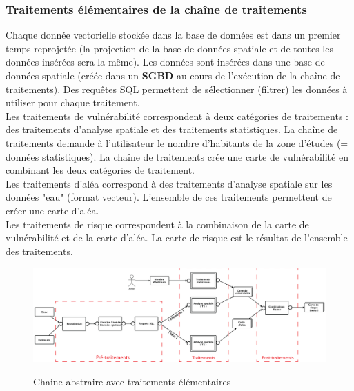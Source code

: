 \subsubsection{Traitements élémentaires de la chaîne de traitements}

Chaque donnée vectorielle stockée dans la base de données est dans un premier temps reprojetée (la projection de la base de données spatiale et de toutes les données insérées sera la même). Les données sont insérées dans une base de données spatiale (créée dans un \textbf{SGBD} au cours de l'exécution de la chaîne de traitements). Des requêtes SQL permettent de sélectionner (filtrer) les données à utiliser pour chaque traitement.\\

Les traitements de vulnérabilité correspondent à deux catégories de traitements : des traitements d'analyse spatiale et des traitements statistiques. La chaîne de traitements demande à l'utilisateur le nombre d'habitants de la zone d'études (= données statistiques). La chaîne de traitements crée une carte de vulnérabilité en combinant les deux catégories de traitement.\\

Les traitements d'aléa correspond à des traitements d'analyse spatiale sur les données "eau" (format vecteur). L'ensemble de ces traitements permettent de créer une carte d'aléa.\\

Les traitements de risque correspondent à la combinaison de la carte de vulnérabilité et de la carte d'aléa. La carte de risque est le résultat de l'ensemble des traitements.


\begin{figure}[H]
\begin{center}

\includegraphics[width=15cm]{Traitements3.png}\\
\caption{\label{Traitement13} Chaine abstraire avec traitements élémentaires}
\end{center}

\end{figure}




